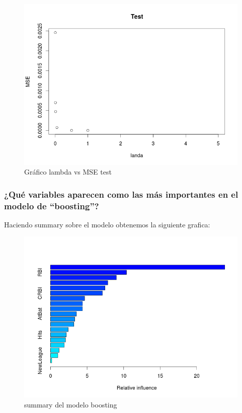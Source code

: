 \begin{figure}[H]
\centering
\includegraphics[scale=0.60]{ej3-3.png}
\caption{Gráfico lambda vs MSE test}
\label{}
\end{figure}



\subsubsection{¿Qué variables aparecen como las más importantes en el modelo de ``boosting''?}

Haciendo summary sobre el modelo obtenemos la siguiente grafica:

\begin{figure}[H]
\centering
\includegraphics[scale=0.60]{ej3-4.png}
\caption{summary del modelo boosting}
\label{}
\end{figure}

